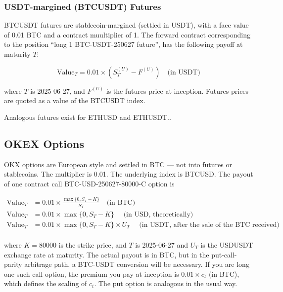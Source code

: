\documentclass[12pt]{article}
\begin{document}
\subsubsection{USDT-margined (BTCUSDT) Futures}

BTCUSDT futures are stablecoin-margined (settled in USDT), with a face value of 0.01 BTC and a contract muultiplier of 1. The forward contract corresponding to the position ``long 1 BTC-USDT-250627 future'', has the following payoff at maturity $T$:

\begin{equation}
\text{Value}_T = 0.01\times(S^{(U)}_T - F^{(U)})   \quad\text{(in USDT)}
\end{equation}

where $T$ is 2025-06-27, and $F^{(U)}$ is the futures price at inception. Futures prices are quoted as a value of the BTCUSDT index.

Analogous futures exist for ETHUSD and ETHUSDT.\cite{okx_futures}.

\subsection{OKEX Options}

OKX options are European style and settled in BTC — not into futures or stablecoins. The multiplier is 0.01. The underlying index is BTCUSD. The payout of one contract call BTC-USD-250627-80000-C option is

\begin{align}
\text{Value}_T &=  0.01\times\frac{\max\{0, S_T - K\}}{S_T} \quad\text{(in BTC)}\\
\text{Value}_T &=  0.01\times\max\{0, S_T - K\} \quad\text{  (in USD, theoretically)}\\
\text{Value}_T &=  0.01\times\max\{0, S_T - K\} \times U_T \quad\text{  (in USDT, after the sale of the BTC received)}\\
\end{align}

where $K=80000$ is the strike price, and $T$ is 2025-06-27 and $U_T$ is the USDUSDT exchange rate at maturity. The actual payout is in BTC, but in the put-call-parity arbitrage path, a BTC-USDT conversion will be necessary. If you are long one such call option, the premium you pay at inception is $0.01 \times c_t$ (in BTC), which defines the scaling of $c_t$. The put option is analogous in the usual way.
\end{document}
